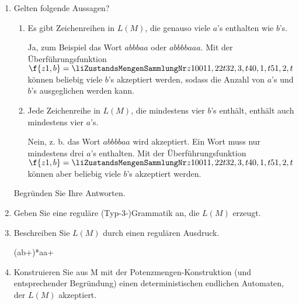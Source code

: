 \documentclass{lehramt-informatik-aufgabe}
\begin{document}
\begin{enumerate}


\item Gelten folgende Aussagen?

\begin{enumerate}


\item Es gibt Zeichenreihen in $L(M)$, die genauso viele $a$’s enthalten
wie $b$’s.

\begin{liAntwort}
Ja, zum Beispiel das Wort $abbbaa$ oder $abbbbaaa$. Mit der
Überführungsfunktion $\f{z1, b} = \z{ z1 }$ können beliebig viele $b$’s
akzeptiert werden, sodass die Anzahl von $a$’s und $b$’s ausgeglichen
werden kann.
\end{liAntwort}


\item Jede Zeichenreihe in $L(M)$, die mindestens vier $b$’s enthält,
enthält auch mindestens vier $a$’s.

\begin{liAntwort}
Nein, z. b. das Wort $abbbbaa$ wird akzeptiert. Ein Wort muss nur
mindestens drei $a$’s enthalten. Mit der Überführungsfunktion $\f{z1, b}
= \z{ z1 }$ können aber beliebig viele $b$’s akzeptiert werden.
\end{liAntwort}

\end{enumerate}

Begründen Sie Ihre Antworten.


\item Geben Sie eine reguläre (Typ-3-)Grammatik an, die $L(M)$ erzeugt.


\item Beschreiben Sie $L(M)$ durch einen regulären Ausdruck.

\begin{liAntwort}
(ab+)*aa+
\end{liAntwort}


\item Konstruieren Sie aus M mit der Potenzmengen-Konstruktion (und
entsprechender Begründung) einen deterministischen endlichen Automaten,
der $L(M)$ akzeptiert.


\end{enumerate}
\end{document}
